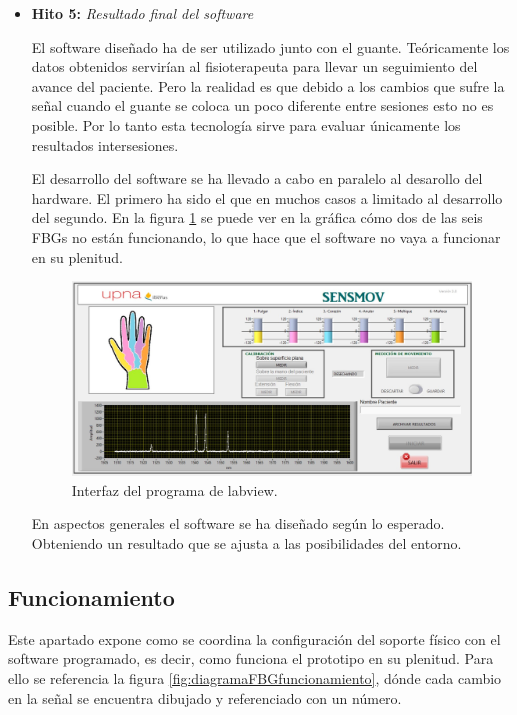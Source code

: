 \begin{itemize} [label=]
	\item \textbf{Hito 5:} \textit{Resultado final del software}

	El software diseñado ha de ser utilizado junto con el guante. Teóricamente los datos obtenidos servirían al fisioterapeuta para llevar un seguimiento del avance del paciente. Pero la realidad es que debido a los cambios que sufre la señal cuando el guante se coloca un poco diferente entre sesiones esto no es posible. Por lo tanto esta tecnología sirve para evaluar únicamente los resultados intersesiones.
	
	El desarrollo del software se ha llevado a cabo en paralelo al desarollo del hardware. El primero ha sido el que en muchos casos a limitado al desarrollo del segundo. En la figura \ref{fig:interfazSM} se puede ver en la gráfica cómo dos de las seis FBGs no están funcionando, lo que hace que el software no vaya a funcionar en su plenitud. 
		
	\begin{figure}[H]
		\centering
		\includegraphics[width=1\textwidth]{./img/interfazSM}
		\caption{Interfaz del programa de labview.}
		\label{fig:interfazSM}
	\end{figure}	
	
	En aspectos generales el software se ha diseñado según lo esperado. Obteniendo un resultado que se ajusta a las posibilidades del entorno.
\end{itemize}


\subsection{Funcionamiento}
\label{sec:funcionamiento3}

Este apartado expone como se coordina la configuración del soporte físico con el software programado, es decir, como funciona el prototipo en su plenitud. Para ello se referencia la figura \ref{fig:diagramaFBGfuncionamiento}, dónde cada cambio en la señal se encuentra dibujado y referenciado con un número.

